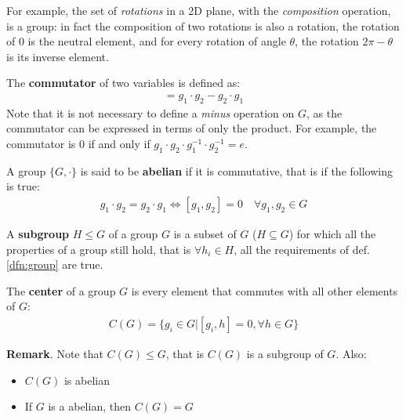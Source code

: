 \documentclass[../Theoretical.tex]{subfiles}
\begin{document}
For example, the set of \textit{rotations} in a 2D plane, with the \textit{composition} operation, is a group: in fact the composition of two rotations is also a rotation, the rotation of $0$ is the neutral element, and for every rotation of angle $\theta$, the rotation $2\pi-\theta$ is its inverse element.

\begin{dfn}
The \textbf{commutator} of two variables is defined as:
\begin{align*}
[g_1, g_2] = g_1 \cdot g_2 - g_2 \cdot g_1
\end{align*}
Note that it is not necessary to define a \textit{minus} operation on $G$, as the commutator can be expressed in terms of only the product. For example, the commutator is $0$ if and only if $g_1 \cdot g_2 \cdot g_1^{-1} \cdot g_{2}^{-1} = e$.
\end{dfn}

\begin{dfn}
A group $\{G, \cdot\}$ is said to be \textbf{abelian} if it is commutative, that is if the following is true:
\begin{align*}
g_1 \cdot g_2 = g_2 \cdot g_1 \Leftrightarrow [g_1, g_2] = 0 \quad \forall g_1, g_2 \in G
\end{align*}
\end{dfn}

\begin{dfn}
A \textbf{subgroup} $H \leq G$ of a group $G$ is a subset of $G$ ($H \subseteq G$) for which all the properties of a group still hold, that is $\forall h_i \in H$, all the requirements of def. \ref{dfn:group} are true.
\end{dfn}

\begin{dfn}
The \textbf{center} of a group $G$ is every element that commutes with all other elements of $G$:
\begin{align*}
C(G) = \{g_i \in G | [g_i, h] = 0, \forall h \in G\}
\end{align*}
\end{dfn}

\textbf{Remark}. Note that $C(G) \leq G$, that is $C(G)$ is a subgroup of $G$. Also:
\begin{itemize}
\item $C(G)$ is abelian
\item If $G$ is a abelian, then $C(G)=G$
\end{itemize}
\end{document}
